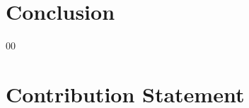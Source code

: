 \documentclass[conference]{IEEEtran}
\begin{document}
\section{Conclusion}

\begin{thebibliography}{00}
\end{thebibliography}

\clearpage
\section*{Contribution Statement}
\end{document}
